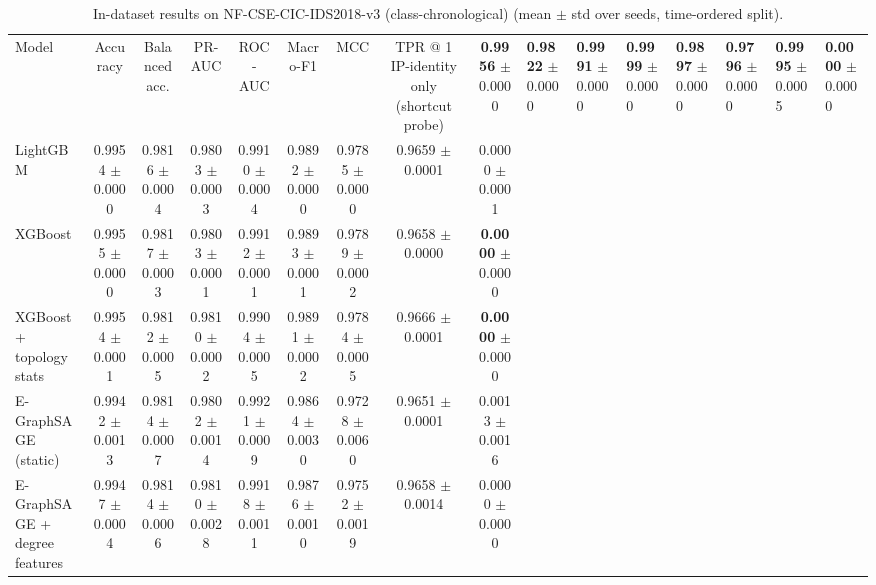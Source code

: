 \begin{table}[t]
\centering
\caption{In-dataset results on NF-CSE-CIC-IDS2018-v3 (class-chronological) (mean $\pm$ std over seeds, time-ordered split).}
\begin{tabular}{lcccccccc}
\toprule
Model & Accuracy & Balanced acc. & PR-AUC & ROC-AUC & Macro-F1 & MCC & TPR @ 1%
\midrule
IP-identity only (shortcut probe) & \textbf{0.9956} {\scriptsize $\pm$ 0.0000} & \textbf{0.9822} {\scriptsize $\pm$ 0.0000} & \textbf{0.9991} {\scriptsize $\pm$ 0.0000} & \textbf{0.9999} {\scriptsize $\pm$ 0.0000} & \textbf{0.9897} {\scriptsize $\pm$ 0.0000} & \textbf{0.9796} {\scriptsize $\pm$ 0.0000} & \textbf{0.9995} {\scriptsize $\pm$ 0.0005} & \textbf{0.0000} {\scriptsize $\pm$ 0.0000} \\
LightGBM & 0.9954 {\scriptsize $\pm$ 0.0000} & 0.9816 {\scriptsize $\pm$ 0.0004} & 0.9803 {\scriptsize $\pm$ 0.0003} & 0.9910 {\scriptsize $\pm$ 0.0004} & 0.9892 {\scriptsize $\pm$ 0.0000} & 0.9785 {\scriptsize $\pm$ 0.0000} & 0.9659 {\scriptsize $\pm$ 0.0001} & 0.0000 {\scriptsize $\pm$ 0.0001} \\
XGBoost & 0.9955 {\scriptsize $\pm$ 0.0000} & 0.9817 {\scriptsize $\pm$ 0.0003} & 0.9803 {\scriptsize $\pm$ 0.0001} & 0.9912 {\scriptsize $\pm$ 0.0001} & 0.9893 {\scriptsize $\pm$ 0.0001} & 0.9789 {\scriptsize $\pm$ 0.0002} & 0.9658 {\scriptsize $\pm$ 0.0000} & \textbf{0.0000} {\scriptsize $\pm$ 0.0000} \\
XGBoost + topology stats & 0.9954 {\scriptsize $\pm$ 0.0001} & 0.9812 {\scriptsize $\pm$ 0.0005} & 0.9810 {\scriptsize $\pm$ 0.0002} & 0.9904 {\scriptsize $\pm$ 0.0005} & 0.9891 {\scriptsize $\pm$ 0.0002} & 0.9784 {\scriptsize $\pm$ 0.0005} & 0.9666 {\scriptsize $\pm$ 0.0001} & \textbf{0.0000} {\scriptsize $\pm$ 0.0000} \\
E-GraphSAGE (static) & 0.9942 {\scriptsize $\pm$ 0.0013} & 0.9814 {\scriptsize $\pm$ 0.0007} & 0.9802 {\scriptsize $\pm$ 0.0014} & 0.9921 {\scriptsize $\pm$ 0.0009} & 0.9864 {\scriptsize $\pm$ 0.0030} & 0.9728 {\scriptsize $\pm$ 0.0060} & 0.9651 {\scriptsize $\pm$ 0.0001} & 0.0013 {\scriptsize $\pm$ 0.0016} \\
E-GraphSAGE + degree features & 0.9947 {\scriptsize $\pm$ 0.0004} & 0.9814 {\scriptsize $\pm$ 0.0006} & 0.9810 {\scriptsize $\pm$ 0.0028} & 0.9918 {\scriptsize $\pm$ 0.0011} & 0.9876 {\scriptsize $\pm$ 0.0010} & 0.9752 {\scriptsize $\pm$ 0.0019} & 0.9658 {\scriptsize $\pm$ 0.0014} & 0.0000 {\scriptsize $\pm$ 0.0000} \\

\end{tabular}
\end{table}

